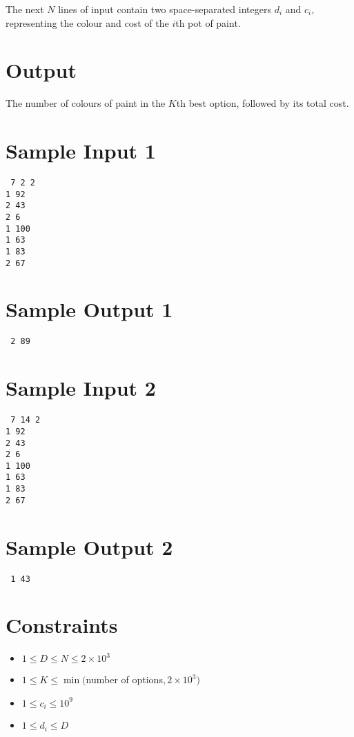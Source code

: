 \documentclass{article}
\begin{document}
The next $N$ lines of input contain two space-separated integers $d_i$ and $c_i$, representing the colour and cost of the $i$th pot of paint.

\section*{Output}
The number of colours of paint in the $K$th best option, followed by its total cost.

\begin{multicols}{2}
\section*{Sample Input 1}
{\tt
7 2 2\\
1 92\\
2 43\\
2 6\\
1 100\\
1 63\\
1 83\\
2 67\\
}

\columnbreak
\section*{Sample Output 1}
{\tt
2 89
}
\end{multicols}

\newpage
\begin{multicols}{2}
\section*{Sample Input 2}
{\tt
7 14 2\\
1 92\\
2 43\\
2 6\\
1 100\\
1 63\\
1 83\\
2 67\\
}
\columnbreak
\section*{Sample Output 2}
{\tt
1 43
}
\end{multicols}

\section*{Constraints}
\begin{itemize}
\item $1 \le D \le N \le 2\times10^3$
\item $1 \le K \le \min($number of options$, 2\times10^3)$
\item $1 \le c_i \le 10^9$
\item $1 \le d_i \le D$
\end{itemize}
\end{document}
